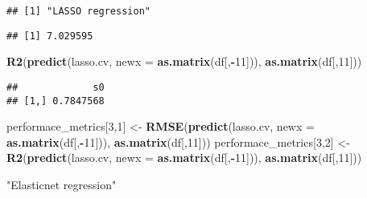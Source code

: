 \documentclass[
]{article}
\newenvironment{Shaded}{\begin{snugshade}}{\end{snugshade}}
\newcommand{\DataTypeTok}[1]{\textcolor[rgb]{0.13,0.29,0.53}{#1}}
\newcommand{\DecValTok}[1]{\textcolor[rgb]{0.00,0.00,0.81}{#1}}
\newcommand{\KeywordTok}[1]{\textcolor[rgb]{0.13,0.29,0.53}{\textbf{#1}}}
\newcommand{\NormalTok}[1]{#1}
\newcommand{\OperatorTok}[1]{\textcolor[rgb]{0.81,0.36,0.00}{\textbf{#1}}}
\newcommand{\StringTok}[1]{\textcolor[rgb]{0.31,0.60,0.02}{#1}}
\begin{document}
\begin{verbatim}
## [1] "LASSO regression"
\end{verbatim}

\begin{Shaded}
\end{Shaded}

\begin{verbatim}
## [1] 7.029595
\end{verbatim}

\begin{Shaded}
\begin{Highlighting}[]
\KeywordTok{R2}\NormalTok{(}\KeywordTok{predict}\NormalTok{(lasso.cv, }\DataTypeTok{newx =} \KeywordTok{as.matrix}\NormalTok{(df[,}\OperatorTok{-}\DecValTok{11}\NormalTok{])), }\KeywordTok{as.matrix}\NormalTok{(df[,}\DecValTok{11}\NormalTok{]))}
\end{Highlighting}
\end{Shaded}

\begin{verbatim}
##             s0
## [1,] 0.7847568
\end{verbatim}

\begin{Shaded}
\begin{Highlighting}[]
\NormalTok{performace_metrics[}\DecValTok{3}\NormalTok{,}\DecValTok{1}\NormalTok{] <-}\StringTok{ }\KeywordTok{RMSE}\NormalTok{(}\KeywordTok{predict}\NormalTok{(lasso.cv, }\DataTypeTok{newx =} \KeywordTok{as.matrix}\NormalTok{(df[,}\OperatorTok{-}\DecValTok{11}\NormalTok{])), }\KeywordTok{as.matrix}\NormalTok{(df[,}\DecValTok{11}\NormalTok{]))}
\NormalTok{performace_metrics[}\DecValTok{3}\NormalTok{,}\DecValTok{2}\NormalTok{] <-}\StringTok{ }\KeywordTok{R2}\NormalTok{(}\KeywordTok{predict}\NormalTok{(lasso.cv, }\DataTypeTok{newx =} \KeywordTok{as.matrix}\NormalTok{(df[,}\OperatorTok{-}\DecValTok{11}\NormalTok{])), }\KeywordTok{as.matrix}\NormalTok{(df[,}\DecValTok{11}\NormalTok{]))}

\StringTok{"Elasticnet regression"}
\end{Highlighting}
\end{Shaded}
\end{document}
